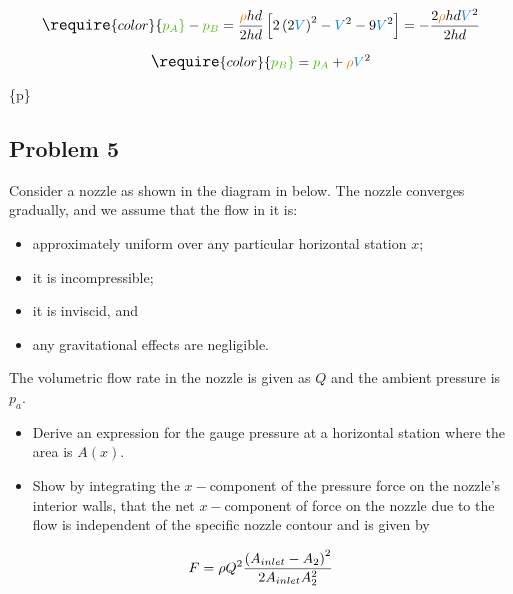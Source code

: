 \documentclass[
  1.2em,
  letterpaper,
  DIV=11,
  numbers=noendperiod]{scrartcl}
\providecommand{\tightlist}{%
  \setlength{\itemsep}{0pt}\setlength{\parskip}{0pt}}\usepackage{longtable,booktabs,array}
\begin{document}
\[
\large
\require{color}
{\color[rgb]{0.315209,0.728565,0.037706}p_{A}} - {\color[rgb]{0.315209,0.728565,0.037706}p_{B}} = \frac{{\color[rgb]{0.918231,0.469102,0.038229}\rho} h d}{2 h d}\left[ 2 \left(2 {\color[rgb]{0.059472,0.501943,0.998465}V}\right)^2 - {\color[rgb]{0.059472,0.501943,0.998465}V}^2 - 9{\color[rgb]{0.059472,0.501943,0.998465}V}^2\right] = - \frac{2 {\color[rgb]{0.918231,0.469102,0.038229}\rho} h d{\color[rgb]{0.059472,0.501943,0.998465}V}^2}{2hd}
\]

\[
\large
\require{color}
{\color[rgb]{0.315209,0.728565,0.037706}p_{B}} = {\color[rgb]{0.315209,0.728565,0.037706}p_{A}} + {\color[rgb]{0.918231,0.469102,0.038229}\rho} {\color[rgb]{0.059472,0.501943,0.998465}V}^2
\]

\{\color[rgb]{0.315209,0.728565,0.037706}p\}

\hypertarget{problem-5}{%
\subsection{Problem 5}\label{problem-5}}

Consider a nozzle as shown in the diagram in below. The nozzle converges
gradually, and we assume that the flow in it is:

\begin{itemize}
\tightlist
\item
  approximately uniform over any particular horizontal station \(x\);
\item
  it is incompressible;
\item
  it is inviscid, and
\item
  any gravitational effects are negligible.
\end{itemize}

The volumetric flow rate in the nozzle is given as \(Q\) and the ambient
pressure is \(p_a\).

\begin{itemize}
\item
  Derive an expression for the gauge pressure at a horizontal station
  where the area is \(A\left(x\right)\).
\item
  Show by integrating the \(x-\)component of the pressure force on the
  nozzle's interior walls, that the net \(x-\)component of force on the
  nozzle due to the flow is independent of the specific nozzle contour
  and is given by
\end{itemize}

\[
\large
F = \rho Q^2 \frac{\left(A_{inlet} - A_2\right)^2}{2A_{inlet} A^2_2}
\]
\end{document}
